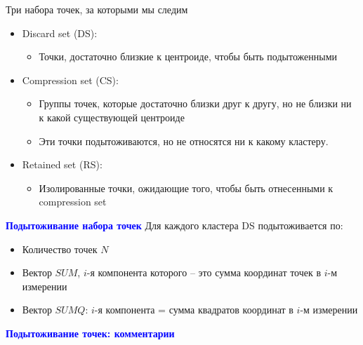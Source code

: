 \documentclass[landscape]{slides}
\begin{document}
\begin{normalsize}
\begin{slide}
Три набора точек, за которыми мы следим
\begin{itemize}
\item Discard set (DS):
  \begin{itemize}
  \item Точки, достаточно близкие к центроиде, чтобы быть подытоженными
  \end{itemize}
\item Compression set (CS):
  \begin{itemize}
  \item Группы точек, которые достаточно близки друг к другу, но не близки ни к какой существующей центроиде
  \item Эти точки подытоживаются, но не относятся ни к какому кластеру.
  \end{itemize}
\item Retained set (RS):
  \begin{itemize}
  \item Изолированные точки, ожидающие того, чтобы быть отнесенными к compression set
  \end{itemize}
\end{itemize}
\end{slide}



\begin{slide}
\textbf{\textcolor{blue}{Подытоживание набора точек}}
Для каждого кластера DS подытоживается по:

\begin{itemize}
\item Количество точек $N$
\item Вектор $SUM$, $i$-я компонента которого -- это сумма координат точек в $i$-м измерении
\item Вектор $SUMQ$: $i$-я компонента = сумма квадратов координат в $i$-м измерении
\end{itemize}
\end{slide}



\begin{slide}
\textbf{\textcolor{blue}{Подытоживание точек: комментарии}}


\end{slide}
\end{normalsize}
\end{document}
